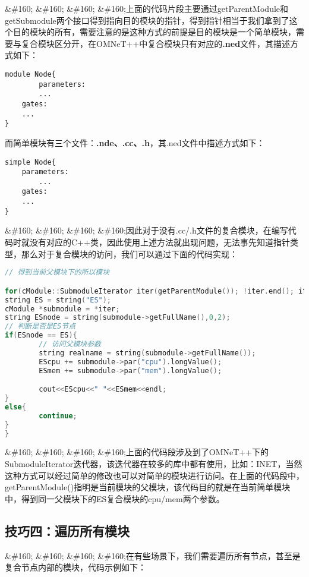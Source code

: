 \&\#160; \&\#160; \&\#160; \&\#160;上面的代码片段主要通过getParentModule和getSubmodule两个接口得到指向目的模块的指针，得到指针相当于我们拿到了这个目的模块的所有，需要注意的是这种方式的前提是目的模块是一个简单模块，需要与复合模块区分开，在OMNeT++中复合模块只有对应的\textbf{.ned}文件，其描述方式如下：

\begin{verbatim}
module Node{
        parameters:
        ...
    gates:
    ...
}
\end{verbatim}

而简单模块有三个文件：\textbf{.nde、.cc、.h}，其.ned文件中描述方式如下：

\begin{verbatim}
simple Node{
    parameters:
        ...
    gates:
    ...
}
\end{verbatim}

\&\#160; \&\#160; \&\#160; \&\#160;因此对于没有.cc\slash .h文件的复合模块，在编写代码时就没有对应的C++类，因此使用上述方法就出现问题，无法事先知道指针类型，那么对于复合模块的访问，我们可以通过下面的代码实现：

\begin{lstlisting}[language=c]
// 得到当前父模块下的所以模块

for(cModule::SubmoduleIterator iter(getParentModule()); !iter.end(); iter++){
string ES = string("ES");
cModule *submodule = *iter;
string ESnode = string(submodule->getFullName(),0,2);
// 判断是否是ES节点
if(ESnode == ES){
        // 访问父模块参数
        string realname = string(submodule->getFullName());
        EScpu += submodule->par("cpu").longValue();
        ESmem += submodule->par("mem").longValue();

        cout<<EScpu<<" "<<ESmem<<endl;
}
else{
        continue;
}
}
\end{lstlisting}

\&\#160; \&\#160; \&\#160; \&\#160;上面的代码段涉及到了OMNeT++下的SubmoduleIterator迭代器，该迭代器在较多的库中都有使用，比如：INET，当然这种方式可以经过简单的修改也可以对简单的模块进行访问。在上面的代码段中，getParentModule()指明是当前模块的父模块，该代码目的就是在当前简单模块中，得到同一父模块下的ES复合模块的cpu\slash mem两个参数。

\subsection{技巧四：遍历所有模块}
\label{技巧四：遍历所有模块}

\&\#160; \&\#160; \&\#160; \&\#160;在有些场景下，我们需要遍历所有节点，甚至是复合节点内部的模块，代码示例如下：

